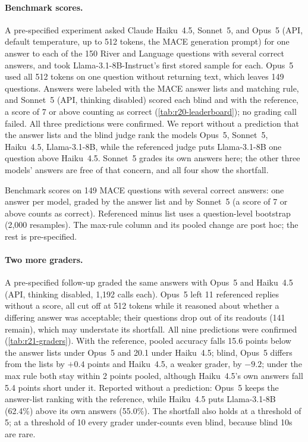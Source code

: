 \paragraph{Benchmark scores.}
A pre-specified experiment asked Claude Haiku~4.5, Sonnet~5, and Opus~5 (API, default temperature, up to 512 tokens, the \textsc{MACE} generation prompt) for one answer to each of the 150 River and Language questions with several correct answers, and took Llama-3.1-8B-Instruct's first stored sample for each. Opus~5 used all 512 tokens on one question without returning text, which leaves 149 questions. Answers were labeled with the \textsc{MACE} answer lists and matching rule, and Sonnet~5 (API, thinking disabled) scored each blind and with the reference, a score of 7 or above counting as correct (\cref{tab:r20-leaderboard}); no grading call failed. All three predictions were confirmed. We report without a prediction that the answer lists and the blind judge rank the models Opus~5, Sonnet~5, Haiku~4.5, Llama-3.1-8B, while the referenced judge puts Llama-3.1-8B one question above Haiku~4.5. Sonnet~5 grades its own answers here; the other three models' answers are free of that concern, and all four show the shortfall.

\begin{table}[htbp]
\centering
\caption{Benchmark scores on 149 \textsc{MACE} questions with several correct answers: one answer per model, graded by the answer list and by Sonnet~5 (a score of 7 or above counts as correct). Referenced minus list uses a question-level bootstrap (2,000 resamples). The max-rule column and its pooled change are post hoc; the rest is pre-specified.}
\label{tab:r20-leaderboard}
\footnotesize
\begin{adjustbox}{max width=\linewidth}\end{adjustbox}
\end{table}

\paragraph{Two more graders.}
A pre-specified follow-up graded the same answers with Opus~5 and Haiku~4.5 (API, thinking disabled, 1,192 calls each). Opus~5 left 11 referenced replies without a score, all cut off at 512 tokens while it reasoned about whether a differing answer was acceptable; their questions drop out of its readouts (141 remain), which may understate its shortfall. All nine predictions were confirmed (\cref{tab:r21-graders}). With the reference, pooled accuracy falls 15.6 points below the answer lists under Opus~5 and 20.1 under Haiku~4.5; blind, Opus~5 differs from the lists by $+0.4$ points and Haiku~4.5, a weaker grader, by $-9.2$; under the max rule both stay within 2 points pooled, although Haiku~4.5's own answers fall 5.4 points short under it. Reported without a prediction: Opus~5 keeps the answer-list ranking with the reference, while Haiku~4.5 puts Llama-3.1-8B (62.4\%) above its own answers (55.0\%). The shortfall also holds at a threshold of 5; at a threshold of 10 every grader under-counts even blind, because blind 10s are rare.

